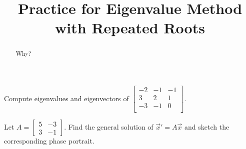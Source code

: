 \documentclass{ximera}
\title{Practice for Eigenvalue Method with Repeated Roots}
\begin{document}
\begin{abstract}
Why?
\end{abstract}
\maketitle



\begin{exercise}
    Compute eigenvalues and eigenvectors of
    $\left[ 
        \begin{smallmatrix}
            -2 & -1 & -1 \\
            3 & 2 & 1 \\
            -3 & -1 & 0 \\
        \end{smallmatrix} 
    \right]$.
\end{exercise}

\begin{exercise}
    Let
    $A = \left[ 
        \begin{smallmatrix} 
            5 & -3 \\ 
            3 & -1 
        \end{smallmatrix} 
    \right]$.
    Find the general solution of ${\vec{x}}' = A \vec{x}$ and sketch the corresponding phase portrait.
\end{exercise}
\end{document}
